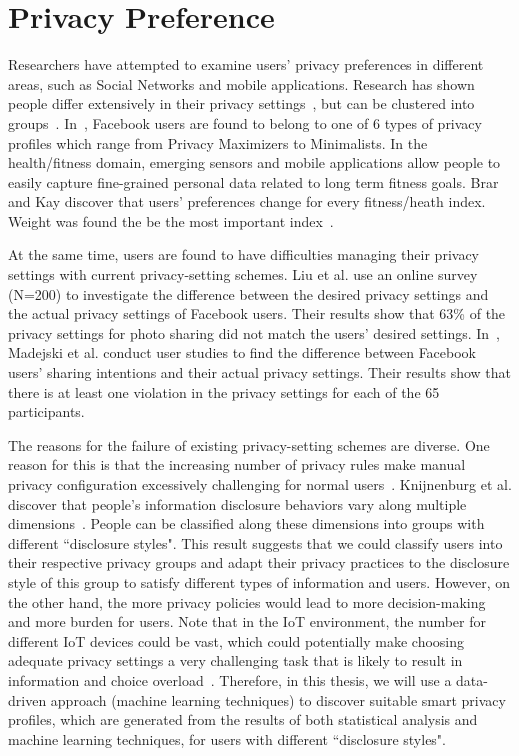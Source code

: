 \section{Privacy Preference}
Researchers have attempted to examine users' privacy preferences in different areas, such as Social Networks and mobile applications. Research has shown people differ extensively in their privacy settings~\cite{olson2005study}, but can be clustered into groups~\cite{anthony2007privacy,knijnenburg2013dimensionality}. In~\cite{wisniewski2014profiling, knijnenburg2017privacy}, Facebook users are found to belong to one of 6 types of privacy profiles which range from Privacy Maximizers to Minimalists. In the health/fitness domain, emerging sensors and mobile applications allow people to easily capture fine-grained personal data related to long term fitness goals. Brar and Kay discover that users' preferences change for every fitness/heath index. Weight was found the be the most important index~\cite{brar2004privacy}. 

At the same time, users are found to have difficulties managing their privacy settings with current privacy-setting schemes. Liu et al. use an online survey (N=200) to investigate the difference between the desired privacy settings and the actual privacy settings of Facebook users. Their results show that 63\% of the privacy settings for photo sharing did not match the users' desired settings. In~\cite{madejski2012study}, Madejski et al. conduct user studies to find the difference between Facebook users’ sharing intentions and their actual privacy settings. Their results show that there is at least one violation in the privacy settings for each of the 65 participants.

The reasons for the failure of existing privacy-setting schemes are diverse. One reason for this is that the increasing number of privacy rules make manual privacy configuration excessively challenging for normal users~\cite{furnell2015managing}. Knijnenburg et al. discover that people's information disclosure behaviors vary along multiple dimensions~\cite{knijnenburg2013dimensionality}. People can be classified along these dimensions into groups with different ``disclosure styles". This result suggests that we could classify users into their respective privacy groups and adapt their privacy practices to the disclosure style of this group to satisfy different types of information and users. However, on the other hand, the more privacy policies would lead to more decision-making and more burden for users. Note that in the IoT environment, the number for different IoT devices could be vast, which could potentially make choosing adequate privacy settings a very challenging task that is likely to result in information and choice overload~\cite{williams2016perfect}. Therefore, in this thesis, we will use a data-driven approach (machine learning techniques) to discover suitable smart privacy profiles, which are generated from the results of both statistical analysis and machine learning techniques, for users with different ``disclosure styles".

